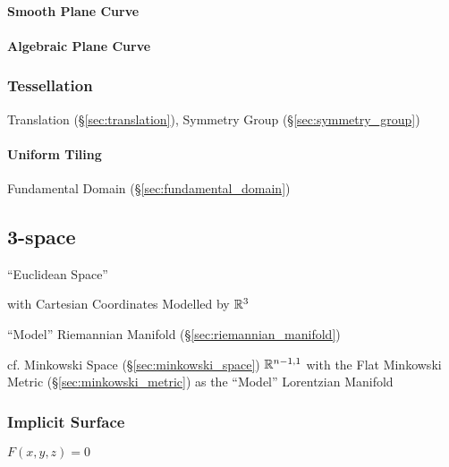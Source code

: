 \paragraph{Smooth Plane Curve}\label{sec:smooth_plane_curve}\hfill

\paragraph{Algebraic Plane Curve}\label{sec:algebraic_plane_curve}\hfill



\subsubsection{Tessellation}\label{sec:tessellation}

\fist Translation (\S\ref{sec:translation}), Symmetry Group
(\S\ref{sec:symmetry_group})



\paragraph{Uniform Tiling}\label{sec:uniform_tiling}\hfill

Fundamental Domain (\S\ref{sec:fundamental_domain})



\subsection{3-space}\label{sec:3_space}

``Euclidean Space''

with Cartesian Coordinates Modelled by $\mathbb{R}^3$

``Model'' Riemannian Manifold (\S\ref{sec:riemannian_manifold})

cf. Minkowski Space (\S\ref{sec:minkowski_space}) $\mathbb{R}^{n-1,1}$
with the Flat Minkowski Metric (\S\ref{sec:minkowski_metric}) as the
``Model'' Lorentzian Manifold



\subsubsection{Implicit Surface}\label{sec:implicit_surface}

$F(x,y,z) = 0$

